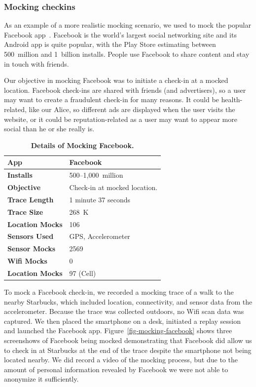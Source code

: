 \subsubsection{Mocking checkins}

As an example of a more realistic mocking scenario, we used \PocketMocker{}
to mock the popular Facebook app~\cite{facebook-playstore-url}. Facebook is
the world's largest social networking site and its Android app is quite
popular, with the Play Store estimating between 500~million and 1~billion
installs. People use Facebook to share content and stay in touch with
friends.

Our objective in mocking Facebook was to initiate a check-in at a mocked
location. Facebook check-ins are shared with friends (and advertisers), so a
user may want to create a fraudulent check-in for many reasons. It could be
health-related, like our Alice, so different ads are displayed when the user
visits the website, or it could be reputation-related as a user may want to
appear more social than he or she really is.

\begin{table}
{\small
\begin{tabularx}{0.6\textwidth}{lX}
\textbf{App} & Facebook \\ \toprule
\textbf{Installs} & 500--1,000~million \\
\textbf{Objective} & Check-in at mocked location. \\
  \midrule
\textbf{Trace Length} & 1 minute 37 seconds \\
\textbf{Trace Size} & 268~K \\
\textbf{Location Mocks} & 106 \\
\textbf{Sensors Used} & {\small GPS, Accelerometer} \\
\textbf{Sensor Mocks} & 2569 \\
\textbf{Wifi Mocks} & 0 \\
\textbf{Location Mocks} & 97 (Cell) \\
\end{tabularx}

\caption{\textbf{Details of Mocking Facebook.}}

\label{table-mocking-facebook}
}
\vspace*{-0.1in}
\end{table}

To mock a Facebook check-in, we recorded a mocking trace of a walk to the
nearby Starbucks, which included location, connectivity, and sensor data from
the accelerometer. Because the trace was collected outdoors, no Wifi scan
data was captured. We then placed the smartphone on a desk, initiated a
replay session and launched the Facebook app.
Figure~\ref{fig-mocking-facebook} shows three screenshows of Facebook being
mocked demonstrating that Facebook did allow us to check in at Starbucks at
the end of the trace despite the smartphone not being located nearby. We did
record a video of the mocking process, but due to the amount of personal
information revealed by Facebook we were not able to anonymize it
sufficiently.

